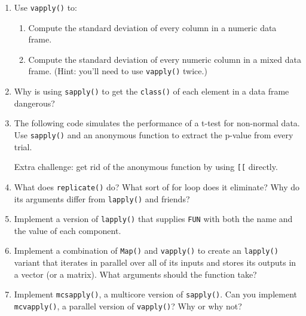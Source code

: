 \begin{enumerate}
\def\labelenumi{\arabic{enumi}.}
\item
  Use \texttt{vapply()} to:

  \begin{enumerate}
  \def\labelenumii{\alph{enumii})}
  \item
    Compute the standard deviation of every column in a numeric data
    frame.
  \item
    Compute the standard deviation of every numeric column in a mixed
    data frame. (Hint: you'll need to use \texttt{vapply()} twice.)
  \end{enumerate}
\item
  Why is using \texttt{sapply()} to get the \texttt{class()} of each
  element in a data frame dangerous?
\item
  The following code simulates the performance of a t-test for
  non-normal data. Use \texttt{sapply()} and an anonymous function to
  extract the p-value from every trial.

\begin{Shaded}
\begin{Highlighting}[]
\StringTok{ }\NormalTok{(}
  \NormalTok{, }
  \NormalTok{(}\NormalTok{(}\NormalTok{, }\NormalTok{), }\NormalTok{(}\NormalTok{, }\NormalTok{)),}
   
\NormalTok{)}
\end{Highlighting}
\end{Shaded}

  Extra challenge: get rid of the anonymous function by using
  \texttt{{[}{[}} directly.
\item
  What does \texttt{replicate()} do? What sort of for loop does it
  eliminate? Why do its arguments differ from \texttt{lapply()} and
  friends?
\item
  Implement a version of \texttt{lapply()} that supplies \texttt{FUN}
  with both the name and the value of each component.
\item
  Implement a combination of \texttt{Map()} and \texttt{vapply()} to
  create an \texttt{lapply()} variant that iterates in parallel over all
  of its inputs and stores its outputs in a vector (or a matrix). What
  arguments should the function take?
\item
  Implement \texttt{mcsapply()}, a multicore version of
  \texttt{sapply()}. Can you implement \texttt{mcvapply()}, a parallel
  version of \texttt{vapply()}? Why or why not?
\end{enumerate}

